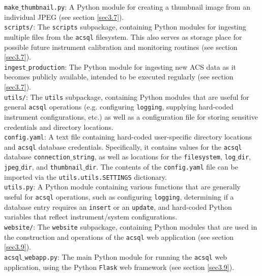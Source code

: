 \documentclass[10pt,journal,compsoc]{IEEEtran}
\begin{document}
\noindent\texttt{make$\_$thumbnail.py}: A Python module for creating a thumbnail image from an individual JPEG (see section \ref{sec3.7}).\\

\noindent\texttt{scripts/}: The \texttt{scripts} subpackage, containing Python modules for ingesting multiple files from the \texttt{acsql} filesystem.  This also serves as storage place for possible
future instrument calibration and monitoring routines (see section \ref{sec3.7}).\\

\noindent\texttt{ingest$\_$production}: The Python module for ingesting new ACS data as it becomes publicly available, intended to be executed regularly (see section \ref{sec3.7}).\\

\noindent\texttt{utils/}: The \texttt{utils} subpackage, containing Python modules that are useful for general \texttt{acsql} operations (e.g. configuring \texttt{logging}, supplying hard-coded
instrument configurations, etc.) as well as a configuration file for storing sensitive credentials and directory locations.\\

\noindent\texttt{config.yaml}: A text file containing hard-coded user-specific directory locations and \texttt{acsql} database credentials.  Specifically, it contains values for the \texttt{acsql}
database \texttt{connection$\_$string}, as well as locations for the \texttt{filesystem}, \texttt{log$\_$dir}, \texttt{jpeg$\_$dir}, and \texttt{thumbnail$\_$dir}.  The contents of the
\texttt{config.yaml} file can be imported via the \texttt{utils.utils.SETTINGS} dictionary.\\

\noindent\texttt{utils.py}: A Python module containing various functions that are generally useful for \texttt{acsql} operations, such as configuring \texttt{logging}, determining if a database
entry requires an \texttt{insert} or an \texttt{update}, and hard-coded Python variables that reflect instrument/system configurations.\\

\noindent\texttt{website/}: The \texttt{website} subpackage, containing Python modules that are used in the construction and operations of the \texttt{acsql} web application (see section \ref{sec3.9}).\\

\noindent\texttt{acsql$\_$webapp.py}: The main Python module for running the \texttt{acsql} web application, using the Python \texttt{Flask} web framework (see section \ref{sec3.9}).\\
\end{document}
